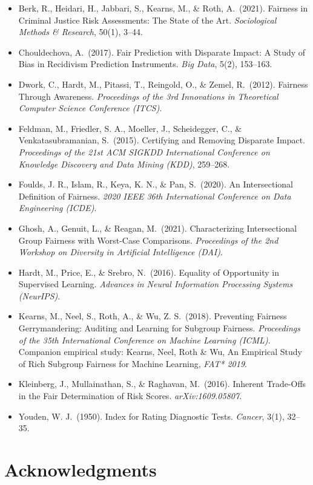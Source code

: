 \documentclass[11pt]{article}
\begin{document}
\begin{itemize}
\item Berk, R., Heidari, H., Jabbari, S., Kearns, M., \& Roth, A.\ (2021).
  Fairness in Criminal Justice Risk Assessments: The State of the Art.
  \emph{Sociological Methods \& Research}, 50(1), 3--44.
\item Chouldechova, A.\ (2017). Fair Prediction with Disparate Impact: A
  Study of Bias in Recidivism Prediction Instruments. \emph{Big Data}, 5(2),
  153--163.
\item Dwork, C., Hardt, M., Pitassi, T., Reingold, O., \& Zemel, R.\ (2012).
  Fairness Through Awareness. \emph{Proceedings of the 3rd Innovations in
  Theoretical Computer Science Conference (ITCS)}.
\item Feldman, M., Friedler, S. A., Moeller, J., Scheidegger, C., \&
  Venkatasubramanian, S.\ (2015). Certifying and Removing Disparate Impact.
  \emph{Proceedings of the 21st ACM SIGKDD International Conference on
  Knowledge Discovery and Data Mining (KDD)}, 259--268.
\item Foulds, J. R., Islam, R., Keya, K. N., \& Pan, S.\ (2020). An
  Intersectional Definition of Fairness. \emph{2020 IEEE 36th International
  Conference on Data Engineering (ICDE)}.
\item Ghosh, A., Genuit, L., \& Reagan, M.\ (2021). Characterizing
  Intersectional Group Fairness with Worst-Case Comparisons. \emph{Proceedings
  of the 2nd Workshop on Diversity in Artificial Intelligence (DAI)}.
\item Hardt, M., Price, E., \& Srebro, N.\ (2016). Equality of Opportunity in
  Supervised Learning. \emph{Advances in Neural Information Processing
  Systems (NeurIPS)}.
\item Kearns, M., Neel, S., Roth, A., \& Wu, Z. S.\ (2018). Preventing
  Fairness Gerrymandering: Auditing and Learning for Subgroup Fairness.
  \emph{Proceedings of the 35th International Conference on Machine Learning
  (ICML)}. Companion empirical study: Kearns, Neel, Roth \& Wu, An Empirical
  Study of Rich Subgroup Fairness for Machine Learning, \emph{FAT* 2019}.
\item Kleinberg, J., Mullainathan, S., \& Raghavan, M.\ (2016). Inherent
  Trade-Offs in the Fair Determination of Risk Scores. \emph{arXiv:1609.05807}.
\item Youden, W. J.\ (1950). Index for Rating Diagnostic Tests. \emph{Cancer},
  3(1), 32--35.
\end{itemize}

\section*{Acknowledgments}
\end{document}
